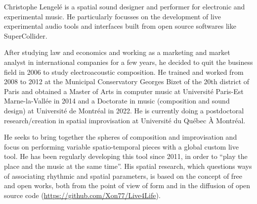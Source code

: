 \documentclass[10pt,a4paper]{article}
\begin{document}
%
%



Christophe Lengelé is a spatial sound designer and performer for electronic and experimental music. He particularly focusses on the development of live experimental audio tools and interfaces built from open source softwares like SuperCollider.

\vspace{1em}
After studying law and economics and working as a marketing and market analyst in international companies for a few years, he decided to quit the business field in 2006 to study electroacoustic composition. He trained and worked from 2008 to 2012 at the Municipal Conservatory Georges Bizet of the 20th district of Paris and obtained a Master of Arts in computer music at Université Paris-Est Marne-la-Vallée in 2014 and a Doctorate in music (composition and sound design) at Université de Montréal in 2022. He is currently doing a postdoctoral research/creation in spatial improvisation at Université du Québec À Montréal.

\vspace{1em}
He seeks to bring together the spheres of composition and improvisation and focus on performing variable spatio-temporal pieces with a global custom live tool. He has been regularly developing this tool since 2011, in order to “play the place and the music at the same time”. His spatial research, which questions ways of associating rhythmic and spatial parameters, is based on the concept of free and open works, both from the point of view of form and in the diffusion of open source code ({\href{https://github.com/Xon77/Live4Life}{https://github.com/Xon77/Live4Life}}). 
\end{document}
